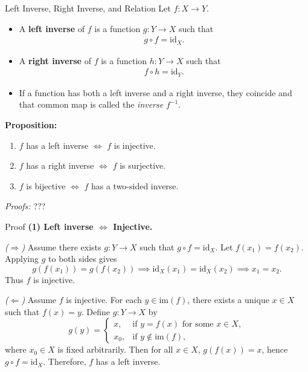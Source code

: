 \begin{frame}{Left Inverse, Right Inverse, and Relation}
Let \(f: X \to Y\).

\begin{itemize}
  \item A \textbf{left inverse} of \(f\) is a function \(g: Y \to X\) such that
  \begin{align*}
    g \circ f = \mathrm{id}_X.
  \end{align*}
  \item A \textbf{right inverse} of \(f\) is a function \(h: Y \to X\) such that
  \begin{align*}
    f \circ h = \mathrm{id}_Y.
  \end{align*}
  \item If a function has both a left inverse and a right inverse, they coincide and that common map is called the \emph{inverse} \(f^{-1}\).
\end{itemize}


\textbf{Proposition:}
\begin{enumerate}
  \item \(f\) has a left inverse \(\iff\) \(f\) is injective.
  \item \(f\) has a right inverse \(\iff\) \(f\) is surjective.
  \item \(f\) is bijective \(\iff\) \(f\) has a two-sided inverse.
\end{enumerate}

\emph{Proofs:} ???
\end{frame}

\begin{frame}{Proof }
\textbf{(1) Left inverse $\Leftrightarrow$ Injective.}

\emph{($\Rightarrow$)}
Assume there exists \(g:Y\to X\) such that \(g\circ f = \mathrm{id}_X.\)
Let \(f(x_1)=f(x_2)\). Applying \(g\) to both sides gives
\[
g(f(x_1)) = g(f(x_2)) \implies \mathrm{id}_X(x_1) = \mathrm{id}_X(x_2) \implies x_1 = x_2.
\]
Thus \(f\) is injective.

\emph{($\Leftarrow$)}
Assume \(f\) is injective.
For each \(y\in\mathrm{im}(f)\), there exists a unique \(x\in X\) such that \(f(x)=y\).
Define \(g:Y\to X\) by
\[
g(y) =
\begin{cases}
x, & \text{if } y=f(x)\text{ for some }x\in X,\\[4pt]
x_0, & \text{if } y\notin\mathrm{im}(f),
\end{cases}
\]
where \(x_0\in X\) is fixed arbitrarily.
Then for all \(x\in X\), \(g(f(x))=x\), hence \(g\circ f=\mathrm{id}_X.\)
Therefore, \(f\) has a left inverse.

\end{frame}


